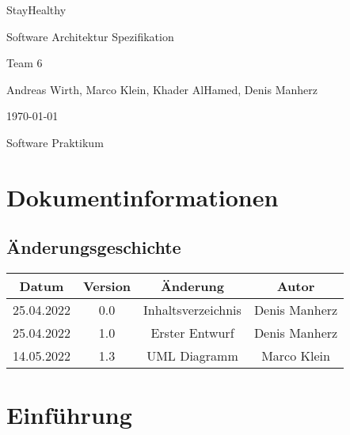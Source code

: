 \documentclass[12pt,a4paper,onecolumn]{article}
\newcommand\titleofdoc{StayHealthy} %
\newcommand\GroupName{Team 6} %
\begin{document}
\begin{titlepage}
   \begin{center}
        \vspace*{4cm} %

        \Huge{\titleofdoc} 

        \vspace{0.5cm}
        \LARGE{Software Architektur Spezifikation}
            
        \vspace{3 cm}
        \Large{\GroupName}
       
        \vspace{0.25cm}
        \large{Andreas Wirth, Marco Klein, Khader AlHamed, Denis Manherz}
       
        \vspace{3 cm}
        \Large{\today}%
        
        \vspace{0.25 cm}
        \Large{Software Praktikum}
       

       \vfill
    \end{center}
\end{titlepage}
\setcounter{page}{2}
\tableofcontents
\newpage

\section{Dokumentinformationen} 
\subsection{Änderungsgeschichte}
\begin{center}
\begin{tabular}{ |c|c|c|c| } 
 \hline
 Datum & Version & Änderung & Autor\\ 
 \hline
 25.04.2022 & 0.0 & Inhaltsverzeichnis & Denis Manherz \\ 
 \hline
 25.04.2022 & 1.0 & Erster Entwurf & Denis Manherz \\ 


 \hline 14.05.2022 & 1.3 & UML Diagramm & Marco Klein \\ 

 \hline
\end{tabular}
\end{center}

\section{Einführung}
\end{document}
